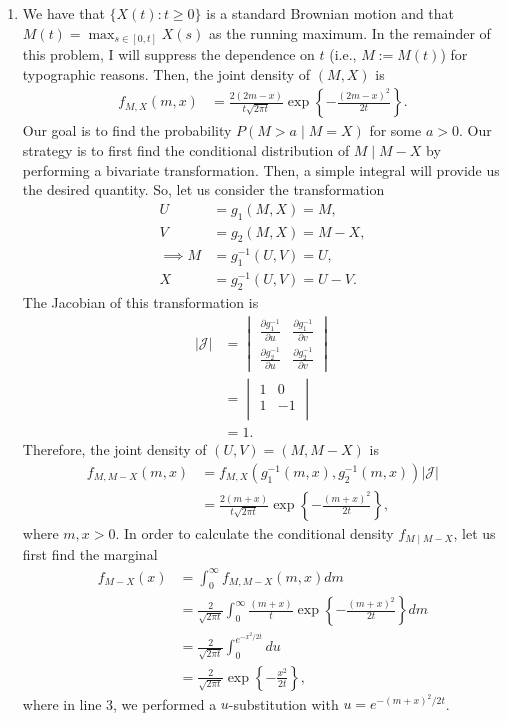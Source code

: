 \documentclass[11pt]{article}
\newcommand{\abs}[1]{\left\lvert#1\right\rvert}
\begin{document}
\begin{enumerate}

\item We have that $\{X(t) : t \geq 0\}$ is a standard Brownian motion and that $M(t) = \max_{s \in [0, t]} X(s)$ as the running maximum. In the remainder of this problem, I will suppress the dependence on $t$ (i.e., $M := M(t)$) for typographic reasons. Then, the joint density of $(M, X)$ is
\begin{align*}
	f_{M, X}(m ,x) &= \frac{2(2m - x)}{t\sqrt{2 \pi t}} \exp \left\{ - \frac{(2m-x)^2}{2t} \right\}.
\end{align*}
Our goal is to find the probability $P(M > a \mid M = X)$ for some $a > 0$. Our strategy is to first find the conditional distribution of $M \mid M - X$ by performing a bivariate transformation. Then, a simple integral will provide us the desired quantity. So, let us consider the transformation
\begin{align*}
	U &= g_1(M, X) = M, \\
	V &= g_2(M, X) = M - X, \\
	\implies M &= g_1^{-1}(U, V) = U, \\
	X &= g_2^{-1}(U, V) = U - V.
\end{align*}
The Jacobian of this transformation is
\begin{align*}
	\abs{\mathcal{J}} &= \begin{vmatrix}
	\frac{\partial g_1^{-1}}{\partial u} & 	\frac{\partial g_1^{-1}}{\partial v} \\
	\frac{\partial g_2^{-1}}{\partial u} & 	\frac{\partial g_2^{-1}}{\partial v}
	\end{vmatrix} \\
	&= \begin{vmatrix}
	1 & 0 \\
	1 & - 1\\
	\end{vmatrix} \\
	&= 1.
\end{align*}
Therefore, the joint density of $(U, V) = (M, M-X)$ is
\begin{align*}
	f_{M, M - X}(m, x) &= f_{M, X}(g_1^{-1}(m, x), g_2^{-1}(m, x)) \abs{\mathcal{J}} \\
	&= \frac{2(m+x)}{t \sqrt{2 \pi t}} \exp \left\{ - \frac{(m+x)^2}{2t} \right\},
\end{align*}
where $m, x > 0$. In order to calculate the conditional density $f_{M \mid M-X}$, let us first find the marginal
\begin{align*}
	f_{M-X}(x) &= \int_{0}^{\infty} f_{M, M - X}(m, x) dm \\
	&= \frac{2}{\sqrt{2 \pi t}} \int_0^{\infty} \frac{(m+x)}{t} \exp \left\{ - \frac{(m+x)^2}{2t} \right\} dm \\
	&= \frac{2}{\sqrt{2 \pi t}} \int_0^{e^{-x^2 / 2t}} du \\
	&= \frac{2}{\sqrt{2 \pi t}} \exp \left\{ - \frac{x^2}{2t} \right\},
\end{align*}
where in line 3, we performed a $u$-substitution with $u = e^{-(m+x)^2 / 2t}$.


\end{enumerate}
\end{document}
